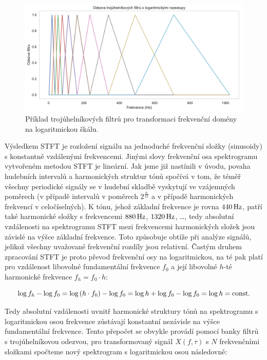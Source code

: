 \begin{figure}[h]\centering
\includegraphics[width=\textwidth,height=\textheight,keepaspectratio]{../img/stft_triangular_filters}
\caption{Příklad trojúhelníkových filtrů pro transformaci frekvenční domény na logaritmickou škálu.}
\label{obr:stft_triangular_filters}
\end{figure}

Výsledkem STFT je rozložení signálu na jednoduché frekvenční složky (sinusoidy) s konstantně vzdálenými frekvencemi. Jinými slovy frekvenční osa spektrogramu vytvořeném metodou STFT je lineární. Jak jsme již nastínili v úvodu, povaha hudebních intervalů a harmonických struktur tónů spočívá v tom, že téměř všechny periodické signály se v hudební skladbě vyskytují ve vzájemných poměrech (v případě intervalů v poměrech $2^{\frac{n}{12}}$ a v případě harmonických frekvencí v celočíselných). K tónu, jehož základní frekvence je rovna $440\,\rm Hz$, patří také harmonické složky s frekvencemi $880\,\rm Hz$, $1320\,\rm Hz$, \dots, tedy absolutní vzdálenosti na spektrogramu STFT mezi frekvencemi harmonických složek jsou závislé na výšce základní frekvence. Toto způsobuje obtíže při analýze signálů, jelikož všechny uvažované frekvenční rozdíly jsou relativní. Častým druhem zpracování STFT je proto převod frekvenční osy na logaritmickou, na té pak platí pro vzdálenost libovolné fundamentální frekvence $f_0$ a její libovolné $h$-té harmonické frekvence $f_h = f_0 \cdot h$:

$$ \log{f_h} - \log{f_0} = \log{(h \cdot f_0)} - \log{f_0} = \log{h} + \log{f_0} - \log{f_0} = \log{h} = \rm const.$$

Tedy absolutní vzdálenosti uvnitř harmonické struktury tónů na spektrogramu s logaritmickou osou frekvence zůstávají konstantní nezávisle na výšce fundamentální frekvence. Tento přepočet se obvykle provádí pomocí banky filtrů s trojúhelníkovou odezvou, pro transformovaný signál $X(f, \tau)$ s $N$ frekvenčními složkami spočteme nový spektrogram s logaritmickou osou následovně:

